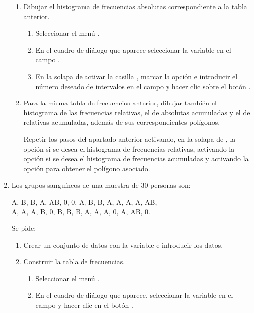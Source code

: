 \begin{enumerate}[leftmargin=*]
\begin{enumerate}
\item  Dibujar el histograma de frecuencias absolutas correspondiente a la tabla anterior.
\begin{indicacion}
\begin{enumerate}
\item Seleccionar el menú .
\item En el cuadro de diálogo que aparece seleccionar la variable  en el campo .
\item En la solapa de  activar la casilla , marcar la opción  e introducir el número deseado de intervalos en el campo  y hacer clic sobre el botón
.
\end{enumerate}
\end{indicacion}

\item Para la misma tabla de frecuencias anterior, dibujar también el histograma de las frecuencias relativas, el de
absolutas acumuladas y el de relativas acumuladas, además de sus correspondientes polígonos.
\begin{indicacion}Repetir los pasos del apartado anterior activando, en la solapa de ,
la opción  si se desea el histograma de frecuencias relativas, activando la opción
 si se desea el histograma de frecuencias acumuladas y activando la opción
 para obtener el polígono asociado.
\end{indicacion}
\end{enumerate}

\item Los grupos sanguíneos de una muestra de 30 personas son:
\begin{center}
A, B, B, A, AB, 0, 0, A, B, B, A, A, A, A, AB,\\
A, A, A, B, 0, B, B, B, A, A, A, 0, A, AB, 0. 
\end{center}
Se pide:
\begin{enumerate}
\item Crear un conjunto de datos con la variable  e introducir los datos.

\item Construir la tabla de frecuencias.
\begin{indicacion}
\begin{enumerate}
\item Seleccionar el menú  .
\item En el cuadro de diálogo que aparece, seleccionar la variable  en el campo
 y hacer clic en el botón .
\end{enumerate}
\end{indicacion}


\end{enumerate}
\end{enumerate}
